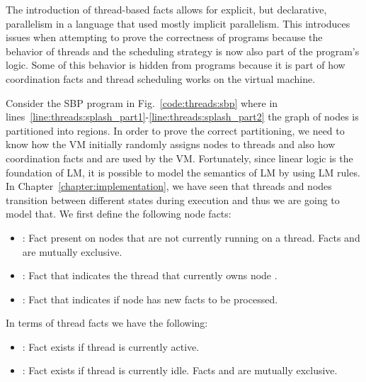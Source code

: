 The introduction of thread-based facts allows for explicit, but declarative,
parallelism in a language that used mostly implicit parallelism. This
introduces issues when attempting to prove the correctness of programs because
the behavior of threads and the scheduling strategy is now also part of the
program's logic.  Some of this behavior is hidden from programs because it is part
of how coordination facts and thread scheduling works on the virtual machine.

Consider the SBP program in Fig.~\ref{code:threads:sbp} where in
lines~\ref{line:threads:splash_part1}-\ref{line:threads:splash_part2} the graph
of nodes is partitioned into regions. In order to prove the correct
partitioning, we need to know how the VM initially randomly assigns nodes to
threads and also how coordination facts  and 
are used by the VM. Fortunately, since linear logic is the foundation of LM, it
is possible to model the semantics of LM by using LM rules. In
Chapter~\ref{chapter:implementation}, we have seen that threads and nodes
transition between different states during execution and thus we are going to
model that. We first define the following node facts:

\begin{itemize}

   \item {}: Fact present on nodes that are not currently
      running on a thread. Facts  and  are
      mutually exclusive.

   \item {}: Fact that indicates the thread
       that currently owns node .

   \item {}: Fact that indicates if node
       has new facts to be processed.

\end{itemize}

In terms of thread facts we have the following:

\begin{itemize}
   \item {}: Fact exists if thread  is currently
      active.

   \item {}: Fact exists if thread  is currently
      idle. Facts  and  are mutually exclusive.
\end{itemize}

